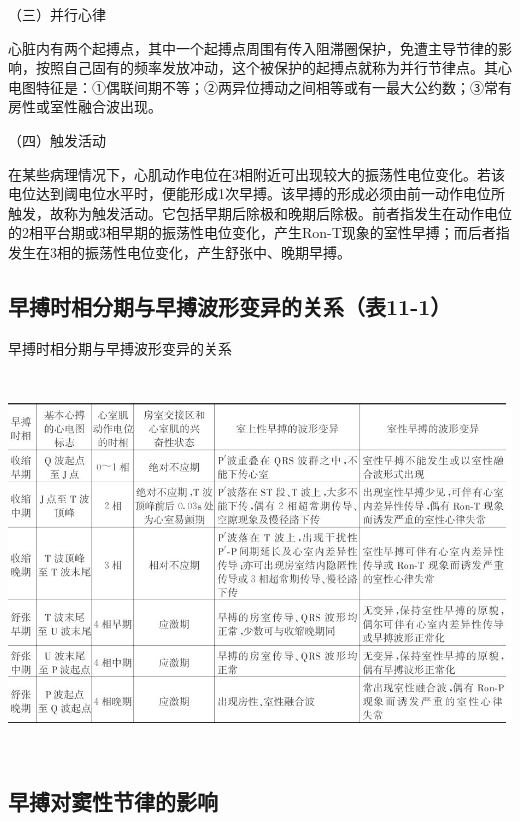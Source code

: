（三）并行心律

心脏内有两个起搏点，其中一个起搏点周围有传入阻滞圈保护，免遭主导节律的影响，按照自己固有的频率发放冲动，这个被保护的起搏点就称为并行节律点。其心电图特征是：①偶联间期不等；②两异位搏动之间相等或有一最大公约数；③常有房性或室性融合波出现。

（四）触发活动

在某些病理情况下，心肌动作电位在3相附近可出现较大的振荡性电位变化。若该电位达到阈电位水平时，便能形成1次早搏。该早搏的形成必须由前一动作电位所触发，故称为触发活动。它包括早期后除极和晚期后除极。前者指发生在动作电位的2相平台期或3相早期的振荡性电位变化，产生Ron-T现象的室性早搏；而后者指发生在3相的振荡性电位变化，产生舒张中、晚期早搏。

\protect\hypertarget{text00018.htmlux5cux23subid127}{}{}

\subsection{早搏时相分期与早搏波形变异的关系（表11-1）}

\begin{table}[htbp]
\centering
\caption{早搏时相分期与早搏波形变异的关系}
\label{tab11-1}
\includegraphics[width=6.22917in,height=3.96875in]{./images/Image00152.jpg}
\end{table}

\protect\hypertarget{text00018.htmlux5cux23subid128}{}{}

\subsection{早搏对窦性节律的影响}


